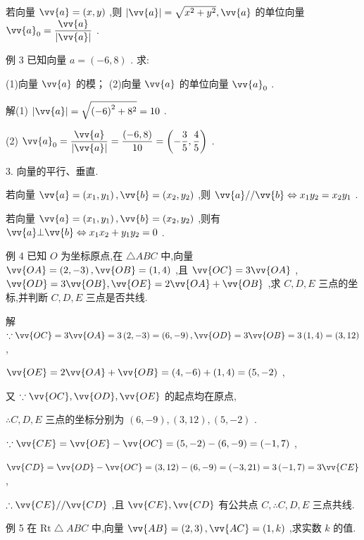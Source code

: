 若向量 $\vv{a} = \left( {x,y}\right)$ ,则 $\left| \vv{a}\right|  = \sqrt{{x}^{2} + {y}^{2}},\vv{a}$ 的单位向量 ${\vv{a}}_{0} = \dfrac{\vv{a}}{\left| \vv{a}\right| }$ .

例 3 已知向量 $a = \left( {-6,8}\right)$ . 求:

(1)向量 $\vv{a}$ 的模； (2)向量 $\vv{a}$ 的单位向量 ${\vv{a}}_{0}$ .

解(1) $\left| \vv{a}\right|  = \sqrt{{\left( -6\right) }^{2} + {8}^{2}} = {10}$ .

(2) ${\vv{a}}_{0} = \dfrac{\vv{a}}{\left| \vv{a}\right| } = \dfrac{\left( -6,8\right) }{10} = \left( {-\dfrac{3}{5},\dfrac{4}{5}}\right)$ .

3. 向量的平行、垂直.

若向量 $\vv{a} = \left( {{x}_{1},{y}_{1}}\right) ,\vv{b} = \left( {{x}_{2},{y}_{2}}\right)$ ,则 $\vv{a}//\vv{b} \Leftrightarrow  {x}_{1}{y}_{2} = {x}_{2}{y}_{1}$ .

若向量 $\vv{a} = \left( {{x}_{1},{y}_{1}}\right) ,\vv{b} = \left( {{x}_{2},{y}_{2}}\right)$ ,则有 $\vv{a} \bot  \vv{b} \Leftrightarrow  {x}_{1}{x}_{2} + {y}_{1}{y}_{2} = 0$ .

例 4 已知 $O$ 为坐标原点,在 $\bigtriangleup {ABC}$ 中,向量 $\vv{OA} = \left( {2, - 3}\right) ,\vv{OB} = \left( {1,4}\right)$ ,且 $\vv{OC} = 3\vv{OA}$ , $\vv{OD} = 3\vv{OB},\vv{OE} = 2\vv{OA} + \vv{OB}$ ,求 $C,D,E$ 三点的坐标,并判断 $C,D,E$ 三点是否共线.

解 $\because \vv{OC} = 3\vv{OA} = 3\left( {2, - 3}\right)  = \left( {6, - 9}\right) ,\vv{OD} = 3\vv{OB} = 3\left( {1,4}\right)  = \left( {3,{12}}\right)$ ,

$\vv{OE} = 2\vv{OA} + \vv{OB} = \left( {4, - 6}\right)  + \left( {1,4}\right)  = \left( {5, - 2}\right)$ ,

又 $\because \vv{OC},\vv{OD},\vv{OE}$ 的起点均在原点,

$\therefore C,D,E$ 三点的坐标分别为 $\left( {6, - 9}\right) ,\left( {3,{12}}\right) ,\left( {5, - 2}\right)$ .

$\because \vv{CE} = \vv{OE} - \vv{OC} = \left( {5, - 2}\right)  - \left( {6, - 9}\right)  = \left( {-1,7}\right)$ ,

$\vv{CD} = \vv{OD} - \vv{OC} = \left( {3,{12}}\right)  - \left( {6, - 9}\right)  = \left( {-3,{21}}\right)  = 3\left( {-1,7}\right)  = 3\vv{CE}$ ,

$\therefore \vv{CE}//\vv{CD}$ ,且 $\vv{CE},\vv{CD}$ 有公共点 $C,\therefore C,D,E$ 三点共线.

例 5 在 $\mathrm{{Rt}}\bigtriangleup {ABC}$ 中,向量 $\vv{AB} = \left( {2,3}\right) ,\vv{AC} = \left( {1,k}\right)$ ,求实数 $k$ 的值.

